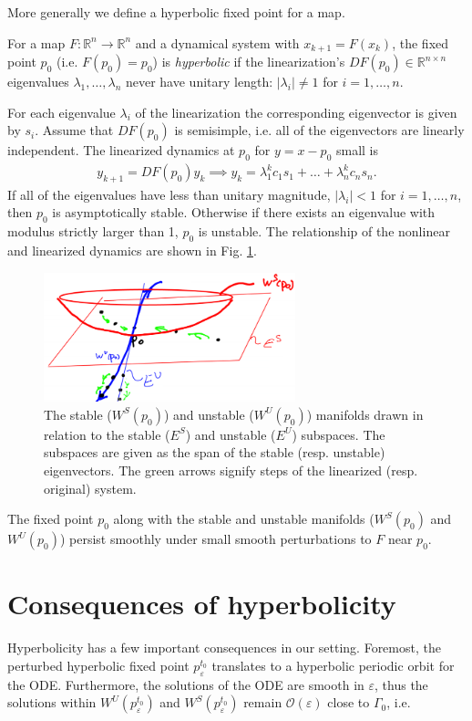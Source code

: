 More generally we define a hyperbolic fixed point for a map.
\begin{definition}
	For a map $F:\mathbb{R}^{n}\to \mathbb{R}^{n}$ and a dynamical system with $x_{k+1} = F(x_k)$, the fixed point $p_0$ (i.e. $F(p_0) = p_0 $) is \emph{hyperbolic} if the linearization's $DF(p_0)\in \mathbb{R}^{n\times n}$ eigenvalues $\lambda_1,\ldots,\lambda_n $ never have unitary length: $|\lambda_i| \neq 1$ for $i=1,\ldots,n$.
\end{definition}

For each eigenvalue $\lambda _i$ of the linearization the corresponding eigenvector is given by $s_i$. Assume that $DF(p_0)$ is semisimple, i.e. all of the eigenvectors are linearly independent. The linearized dynamics at $p_0$ for $y=x-p_0$ small is 
\begin{align}
	y_{k+1} = DF(p_0)y_k \implies y_k = \lambda_1^{k} c_1 s_1 + \ldots + \lambda_n^{k} c_n s_n.	
\end{align}
If all of the eigenvalues have less than unitary magnitude, $|\lambda _i|<1$ for $i=1,\ldots,n$, then $p_0$ is asymptotically stable. Otherwise if there exists an eigenvalue with modulus strictly larger than 1, $p_0$ is unstable. The relationship of the nonlinear and linearized dynamics are shown in Fig. \ref{fig:lin_nonlin_relation}.
\begin{figure}[h!]
	\centering
	\includegraphics[width=0.65\textwidth]{figures/ch6/9lin_nonlin_relationship.png}
	\caption{The stable ($W^{S}(p_0)$) and unstable ($W^{U}(p_0)$) manifolds drawn in relation to the stable ($E^{S}$) and unstable ($E^{U}$) subspaces. The subspaces are given as the span of the stable (resp. unstable) eigenvectors. The green arrows signify steps of the linearized (resp. original) system.}
	\label{fig:lin_nonlin_relation}
\end{figure}

The fixed point $p_0$ along with the stable and unstable manifolds ($W^{S}(p_0)$ and $W^{U}(p_0)$) persist smoothly under small smooth perturbations to $F$ near $p_0$.

\section{Consequences of hyperbolicity}
Hyperbolicity has a few important consequences in our setting. Foremost, the perturbed hyperbolic fixed point $p_{\varepsilon}^{t_0}$ translates to a hyperbolic periodic orbit for the ODE. Furthermore, the solutions of the ODE are smooth in $\varepsilon$, thus the solutions within $W^{U}(p_{\varepsilon}^{t_0})$ and $W^{S}(p_{\varepsilon}^{t_0})$ remain $\mathcal{O}(\varepsilon)$ close to $\Gamma_0$, i.e.


